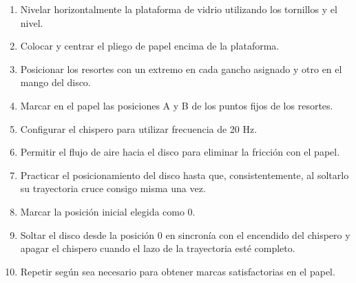 \documentclass[../main.tex]{subfiles}
\begin{document}
\begin{enumerate}
  \item Nivelar horizontalmente la plataforma de vidrio utilizando los tornillos y el nivel.
  \item Colocar y centrar el pliego de papel encima de la plataforma.
  \item Posicionar los resortes con un extremo en cada gancho asignado y otro en el mango del disco.
  \item Marcar en el papel las posiciones A y B de los puntos fijos de los resortes.
  \item Configurar el chispero para utilizar frecuencia de 20 Hz.
  \item Permitir el flujo de aire hacia el disco para eliminar la fricción con el papel.
  \item Practicar el posicionamiento del disco hasta que, consistentemente, al soltarlo su trayectoria cruce consigo misma una vez.
  \item Marcar la posición inicial elegida como 0.
  \item Soltar el disco desde la posición 0 en sincronía con el encendido del chispero y apagar el chispero cuando el lazo de la trayectoria esté completo.
  \item Repetir según sea necesario para obtener marcas satisfactorias en el papel.
\end{enumerate}
\end{document}
